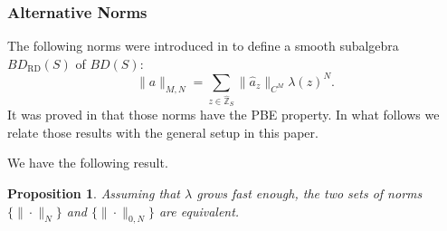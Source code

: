 \documentclass[12pt,reqno]{amsart}
\numberwithin{equation}{section}
\newcommand{\Zshat}{\widehat{\Z}_S}
\newcommand{\Z}{{\mathbb Z}}
\newtheorem{prop}[theo]{{\sc \bf Proposition}}
\begin{document}
\subsubsection{Alternative Norms}
The following norms were introduced in \cite{HKM1} to define a smooth subalgebra $BD_\textrm{RD}(S)$ of $BD(S)$:
\begin{equation*}
\|a\|_{M,N}= \sum_{z\in\Zshat} \|\hat{a}_z\|_{C^M} \lambda(z)^N.
\end{equation*}
It was proved in \cite{HKM1} that those norms have the PBE property.  In what follows we relate those results with the general setup in this paper.

We have the following result.
\begin{prop} Assuming that $\lambda$ grows fast enough, the two sets of norms $\{\|\cdot\|_N\}$ and $\{\|\cdot\|_{0,N}\}$ are equivalent.
\end{prop}
\end{document}

